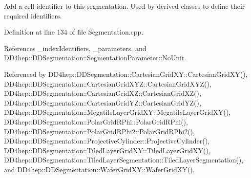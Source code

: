 Add a cell identifier to this segmentation. Used by derived classes to define their required identifiers. 



Definition at line 134 of file Segmentation.\+cpp.



References \+\_\+index\+Identifiers, \+\_\+parameters, and D\+D4hep\+::\+D\+D\+Segmentation\+::\+Segmentation\+Parameter\+::\+No\+Unit.



Referenced by D\+D4hep\+::\+D\+D\+Segmentation\+::\+Cartesian\+Grid\+X\+Y\+::\+Cartesian\+Grid\+X\+Y(), D\+D4hep\+::\+D\+D\+Segmentation\+::\+Cartesian\+Grid\+X\+Y\+Z\+::\+Cartesian\+Grid\+X\+Y\+Z(), D\+D4hep\+::\+D\+D\+Segmentation\+::\+Cartesian\+Grid\+X\+Z\+::\+Cartesian\+Grid\+X\+Z(), D\+D4hep\+::\+D\+D\+Segmentation\+::\+Cartesian\+Grid\+Y\+Z\+::\+Cartesian\+Grid\+Y\+Z(), D\+D4hep\+::\+D\+D\+Segmentation\+::\+Megatile\+Layer\+Grid\+X\+Y\+::\+Megatile\+Layer\+Grid\+X\+Y(), D\+D4hep\+::\+D\+D\+Segmentation\+::\+Polar\+Grid\+R\+Phi\+::\+Polar\+Grid\+R\+Phi(), D\+D4hep\+::\+D\+D\+Segmentation\+::\+Polar\+Grid\+R\+Phi2\+::\+Polar\+Grid\+R\+Phi2(), D\+D4hep\+::\+D\+D\+Segmentation\+::\+Projective\+Cylinder\+::\+Projective\+Cylinder(), D\+D4hep\+::\+D\+D\+Segmentation\+::\+Tiled\+Layer\+Grid\+X\+Y\+::\+Tiled\+Layer\+Grid\+X\+Y(), D\+D4hep\+::\+D\+D\+Segmentation\+::\+Tiled\+Layer\+Segmentation\+::\+Tiled\+Layer\+Segmentation(), and D\+D4hep\+::\+D\+D\+Segmentation\+::\+Wafer\+Grid\+X\+Y\+::\+Wafer\+Grid\+X\+Y().

\hypertarget{class_d_d4hep_1_1_d_d_segmentation_1_1_segmentation_abb84893d0b56ded95213c52dc345ceba}{}\label{class_d_d4hep_1_1_d_d_segmentation_1_1_segmentation_abb84893d0b56ded95213c52dc345ceba} 
